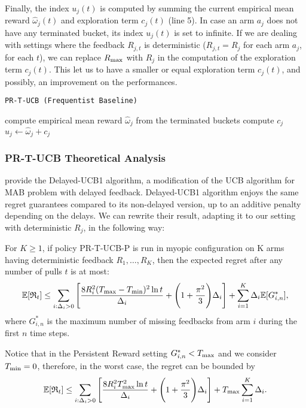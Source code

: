 Finally, the index $u_j(t)$ is computed by summing the current empirical mean reward $\hat{\omega}_j(t) $ and exploration term $c_j(t)$ (line 5). In case an arm $a_j$ does not have any terminated bucket, its index $u_j(t)$ is set to infinite. If we are dealing with settings where the feedback $R_{j,t}$ is deterministic ($R_{j,t}=R_j$ for each arm $a_j$, for each $t$), we can replace $R_{\textnormal{max}}$ with $R_j$ in the computation of the exploration term $c_j(t)$. This let us to have a smaller or equal exploration term $c_j(t)$, and possibly, an improvement on the performances.

\begin{algorithm}[H]
	\caption{\texttt{PR-T-UCB (Frequentist Baseline)}}
	\begin{scriptsize}
		\begin{algorithmic}[1]
			
			\State compute empirical mean reward $\hat{\omega}_j $ from the terminated buckets \;			
			\State compute $c_j$\;
			\State$u_j \gets  \hat{\omega}_j +  c_j$
			\EndFor
			
			\EndFunction
			
		\end{algorithmic}
	\end{scriptsize}
	\label{alg:BaselineUCB}
\end{algorithm}

\subsubsection[]{PR-T-UCB Theoretical Analysis}

\cite{joulani2013} provide the Delayed-UCB1 algorithm, a modification of the UCB algorithm for MAB problem with delayed feedback. Delayed-UCB1 algorithm enjoys the same regret guarantees compared to its non-delayed version, up to an additive penalty depending on the delays. We can rewrite their result, adapting it to our setting with deterministic $R_j$, in the following way:

\begin{theorem}
	For $K \ge 1$, if policy PR-T-UCB-P is run in myopic configuration on K arms having deterministic feedback $R_1,\dots,R_K$, then the expected regret after any number of pulls $t$ is at most:
	\[ \mathbb{E}[\mathfrak{R}_t] \le \sum_{i:\Delta_i>0} \Bigg[ \frac{8 R_i^2 (T_{\textnormal{max}}-T_{\textnormal{min}})^2\ln t }{\Delta_i}  + \Bigg( 1 + \frac{\pi^2}{3} \Bigg)\Delta_i\Bigg]  + \sum_{i=1}^{K} \Delta_i \mathbb{E}[G^*_{i,n}],\]
	where $G^*_{i,n}$ is the maximum number of missing feedbacks from arm $i$ during the first $n$ time steps.
\end{theorem} 
Notice that in the Persistent Reward setting $G^*_{i,n}<T_{\textnormal{max}}$ and we consider $T_{\textnormal{min}} = 0$, therefore, in the worst case, the regret can be bounded by 
\[ \mathbb{E}[\mathfrak{R}_t] \le \sum_{i:\Delta_i>0} \Bigg[ \frac{8 R_i^2 T_{\textnormal{max}}^2\ln t}{\Delta_i} + \Bigg(1 + \frac{\pi^2}{3}\Bigg)\Delta_i \Bigg] + T_{\textnormal{max}}\sum_{i=1}^{K} \Delta_i.\]





